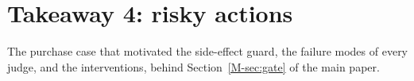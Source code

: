\section{Takeaway 4: risky actions}\label{sec:e}

The purchase case that motivated the side-effect guard, the failure modes of every judge, and the interventions,
behind Section~\ref{M-sec:gate} of the main paper.



